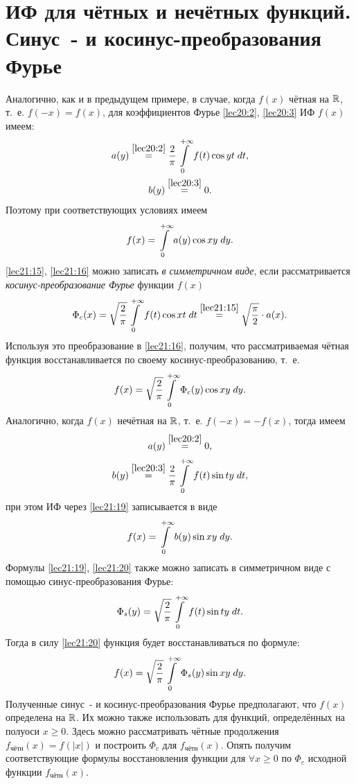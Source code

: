 \documentclass[../../main.tex]{subfiles}
\begin{document}
\section{ИФ для чётных и нечётных функций. Синус~\!- и косинус-преобразования 
Фурье}

Аналогично, как и в предыдущем примере, в случае, 
когда $ f(x) $ чётная на $ \mathbb{R} $, т.~е. $ f(-x) = f(x) $, для коэффициентов 
Фурье
\eqref{lec20:2}, \eqref{lec20:3} ИФ $ f(x) $ имеем:
\begin{equation}
\label{lec21:15}
\begin{gathered}
a(y) \stackrel{\eqref{lec20:2}}{=}
\dfrac{2}{\pi} \int\limits_{0}^{+\infty} f(t) \cos yt\;dt,\\
b(y) \stackrel{\eqref{lec20:3}}{=} 0.
\end{gathered}
\end{equation}
Поэтому при соответствующих условиях имеем 
\begin{equation}
\label{lec21:16}
f(x) = \int\limits_{0}^{+\infty} a(y) \cos xy\;dy.
\end{equation}
\eqref{lec21:15}, \eqref{lec21:16} можно записать \emph{в симметричном 
виде}, если 
рассматривается \emph{косинус-преобразование Фурье} функции $ f(x) $
\[
\Phi_c(x) = \sqrt{\dfrac{2}{\pi}} \int\limits_{0}^{+\infty} f(t) \cos xt\;dt
\stackrel{\eqref{lec21:15}}{=} \sqrt{\dfrac{\pi}{2}}\cdot a(x).
\]
Используя это преобразование в \eqref{lec21:16}, получим, что 
рассматриваемая
чётная функция восстанавливается по своему косинус-преобразованию, т.~е.
\[
f(x) = \sqrt{\dfrac{2}{\pi}} \int\limits_{0}^{+\infty} \Phi_c(y) \cos xy\;dy.
\]
Аналогично, когда $ f(x) $ нечётная на $ \mathbb{R} $, т.~е.
$ f(-x) = -f(x) $, тогда имеем 
\begin{equation}
\label{lec21:18}
a(y) \stackrel{\eqref{lec20:2}}{=} 0,
\end{equation}
\begin{equation}
\label{lec21:19}
b(y) \stackrel{\eqref{lec20:3}}{=}
\dfrac{2}{\pi}
\int\limits_{0}^{+\infty} f(t) \sin ty\;dt,
\end{equation}
при этом ИФ через \eqref{lec21:19} записывается в виде
\begin{equation}
\label{lec21:20}
f(x) = \int\limits_{0}^{+\infty} b(y) \sin xy\;dy.
\end{equation}
Формулы \eqref{lec21:19}, \eqref{lec21:20} также можно записать в
симметричном виде с 
помощью синус-преобразования Фурье:
\begin{equation}
\label{lec21:21}
\Phi_s(y) = \sqrt{\dfrac{2}{\pi}} \int\limits_{0}^{+\infty}
f(t) \sin ty\;dt.
\end{equation}
Тогда в силу \eqref{lec21:20} функция будет восстанавливаться по формуле:
\begin{equation}
\label{lec21:22}
f(x) = \sqrt{\dfrac{2}{\pi}} \int\limits_{0}^{+\infty} \Phi_s(y) \sin xy\;dy.
\end{equation}
Полученные синус~\!- и косинус-преобразования Фурье предполагают, что $ f(x) $ 
определена на $ \mathbb{R} $. Их можно также использовать для функций, определённых
на полуоси $ x \geq 0 $. Здесь можно рассматривать чётные
продолжения $ f_{\text{чётн}}(x) = f(|x|) $ и построить
$ \Phi_c $ для $ f_{\text{чётн}}(x) $. Опять получим соответствующие формулы
восстановления функции для $ \forall x \geq 0 $ по $ \Phi_c$
исходной функции $f_{\text{чётн}}(x)$.
\end{document}
